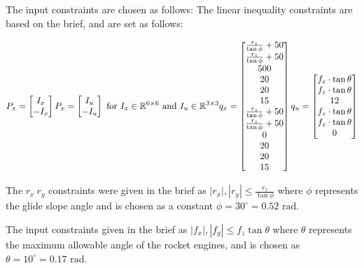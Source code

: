 \documentclass[conference, tikz]{IEEEtran}
\begin{document}
The input constraints are chosen as follows:
The linear inequality constraints are based on the brief, and are set as follows:
\begin{center}
\[
    P_x = 
    \begin{bmatrix}
        I_x\\
        -I_x
    \end{bmatrix}
    P_x = 
    \begin{bmatrix}
        I_u\\
        -I_u    
    \end{bmatrix}
    \text{ for } I_x \in \mathbb{R}^{6\times 6} \text{ and }I_u\in \mathbb{R}^{3\times 3}
    \\
    q_x = 
    \begin{bmatrix}
        \frac{r_z}{\tan{\phi}}+50\\
        \frac{r_z}{\tan{\phi}}+50\\
        500\\
        20\\
        20\\
        15\\
        \frac{r_z}{\tan{\phi}}+50\\
        \frac{r_z}{\tan{\phi}}+50\\
        0\\
        20\\
        20\\
        15
    \end{bmatrix}
    q_u =
    \begin{bmatrix}
        f_z\cdot\tan{\theta}\\
        f_z\cdot\tan{\theta}\\
        12\\
        f_z\cdot\tan{\theta}\\
        f_z\cdot\tan{\theta}\\
        0
    \end{bmatrix}
\]
\end{center}

The $r_x \ r_y$ constraints were given in the brief as $|r_x|, |r_y| \le \frac{r_z}{\tan{\phi}}$ where $\phi$ represents the glide slope angle and is chosen as a constant $\phi = 30^\circ = 0.52\text{ rad}$.

The input constraints given in the brief as $|f_x|, |f_y| \le f_z \tan{\theta}$ where $\theta$ represents the maximum allowable angle of the rocket engines, and is chosen as $\theta = 10 ^\circ = 0.17\text{ rad}$.
\end{document}
